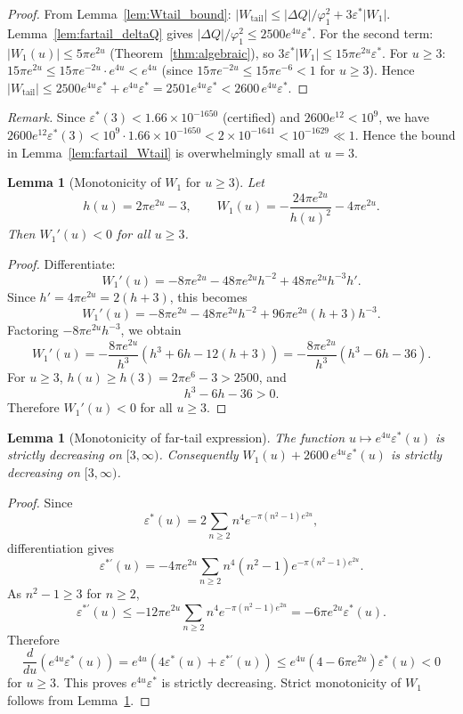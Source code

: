\documentclass[11pt]{article}
\newtheorem{lemma}[theorem]{Lemma}
\theoremstyle{definition}
\theoremstyle{remark}
\begin{document}
\begin{proof}
From Lemma~\ref{lem:Wtail_bound}: $|W_{\mathrm{tail}}| \leq |\Delta Q|/\varphi_1^2 + 3\varepsilon^*|W_1|$.
Lemma~\ref{lem:fartail_deltaQ} gives $|\Delta Q|/\varphi_1^2 \leq 2500e^{4u}\varepsilon^*$.
For the second term: $|W_1(u)| \leq 5\pi e^{2u}$ (Theorem~\ref{thm:algebraic}),
so $3\varepsilon^*|W_1| \leq 15\pi e^{2u}\varepsilon^*$.
For $u\geq3$: $15\pi e^{2u} \leq 15\pi e^{-2u}\cdot e^{4u} < e^{4u}$
(since $15\pi e^{-2u} \leq 15\pi e^{-6} < 1$ for $u\geq3$).
Hence $|W_{\mathrm{tail}}| \leq 2500e^{4u}\varepsilon^* + e^{4u}\varepsilon^* = 2501e^{4u}\varepsilon^*
< 2600\,e^{4u}\varepsilon^*$.
\end{proof}

\noindent\emph{Remark.}
Since $\varepsilon^*(3) < 1.66\times 10^{-1650}$ (certified) and
$2600e^{12} < 10^9$,
we have $2600e^{12}\varepsilon^*(3) < 10^9 \cdot 1.66\times 10^{-1650}
< 2\times 10^{-1641} < 10^{-1629} \ll 1$.
Hence the bound in Lemma~\ref{lem:fartail_Wtail} is overwhelmingly small at $u=3$.

\begin{lemma}[Monotonicity of $W_1$ for $u\ge3$]\label{lem:W1_mono}
Let
\[
h(u)=2\pi e^{2u}-3,\qquad
W_1(u)=-\frac{24\pi e^{2u}}{h(u)^2}-4\pi e^{2u}.
\]
Then $W_1'(u)<0$ for all $u\ge3$.
\end{lemma}

\begin{proof}
Differentiate:
\[
W_1'(u)
=
-8\pi e^{2u}
-
48\pi e^{2u}h^{-2}
+
48\pi e^{2u}h^{-3}h'.
\]
Since $h'=4\pi e^{2u}=2(h+3)$, this becomes
\[
W_1'(u)
=
-8\pi e^{2u}
-
48\pi e^{2u}h^{-2}
+
96\pi e^{2u}(h+3)h^{-3}.
\]
Factoring $-8\pi e^{2u}h^{-3}$, we obtain
\[
W_1'(u)
=
-\frac{8\pi e^{2u}}{h^3}
\left(h^3+6h-12(h+3)\right)
=
-\frac{8\pi e^{2u}}{h^3}
\left(h^3-6h-36\right).
\]
For $u\ge3$, $h(u)\geq h(3)=2\pi e^{6}-3>2500$, and
\[
h^3-6h-36>0.
\]
Therefore $W_1'(u)<0$ for all $u\ge3$.
\end{proof}

\begin{lemma}[Monotonicity of far-tail expression]\label{lem:fartail_mono}
The function $u\mapsto e^{4u}\varepsilon^*(u)$ is strictly decreasing on $[3,\infty)$.
Consequently $W_1(u)+2600\,e^{4u}\varepsilon^*(u)$ is strictly decreasing on $[3,\infty)$.
\end{lemma}

\begin{proof}
Since
\[
\varepsilon^*(u)
=
2\sum_{n\ge2}n^4 e^{-\pi(n^2-1)e^{2u}},
\]
differentiation gives
\[
\varepsilon^{*\prime}(u)
=
-4\pi e^{2u}
\sum_{n\ge2} n^4(n^2-1)e^{-\pi(n^2-1)e^{2u}}.
\]
As $n^2-1\ge3$ for $n\ge2$,
\[
\varepsilon^{*\prime}(u)
\le
-12\pi e^{2u}
\sum_{n\ge2}n^4 e^{-\pi(n^2-1)e^{2u}}
=
-6\pi e^{2u}\varepsilon^*(u).
\]
Therefore
\[
\frac{d}{du}\left(e^{4u}\varepsilon^*(u)\right)
=
e^{4u}(4\varepsilon^*(u)+\varepsilon^{*\prime}(u))
\le
e^{4u}(4-6\pi e^{2u})\varepsilon^*(u)<0
\]
for $u\ge3$.
This proves $e^{4u}\varepsilon^*$ is strictly decreasing.
Strict monotonicity of $W_1$ follows from Lemma~\ref{lem:W1_mono}.
\end{proof}
\end{document}
